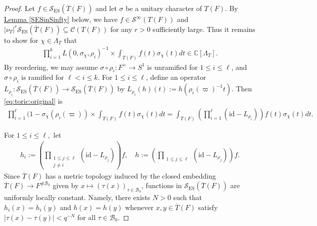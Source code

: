 \documentclass[10pt]{amsart}
\theoremstyle{definition}
\numberwithin{equation}{section}
\numberwithin{equation}{subsection}
\newcommand{\CC}{\mathbb{C}}
\begin{document}
\begin{proof} Let $f\in \mathcal{S}_{\mathrm{ES}}(\overline{T}(F))$ and let $\sigma$ be a unitary character of $T(F)$. By \hyperref[SESinSinfty]{Lemma \ref{SESinSinfty}} below, we have $f\in \mathcal{S}^\infty(T(F))$ and $|\nu_T|^r\mathcal{S}_{\mathrm{ES}}(\overline{T}(F))\subseteq \mathcal{C}(T(F))$ for any $r>0$ sufficiently large. Thus it remains to show for $\chi\in \Lambda_T$ that
\begin{align}\label{eq:toric:original}
     \prod_{i=1}^k L(0,\sigma_\chi,\rho_i)^{-1} \times \int_{T(F)} f(t)\sigma_\chi(t)dt\in \CC[\Lambda_T].
\end{align}
By reordering, we may assume $\sigma\circ \rho_i:F^\times\to S^1$ is unramified for $1\le i\le \ell$, and $\sigma\circ\rho_i$ is ramified for $\ell<i\le k$. For $1\le i\le\ell$, define an operator $L_{\rho_i}:\mathcal{S}_{\mathrm{ES}}(\overline{T}(F))\to \mathcal{S}_{\mathrm{ES}}(\overline{T}(F))$ by $L_{\rho_i}(h)(t) := h(\rho_i(\varpi)^{-1}t).$
Then \eqref{eq:toric:original} is
\begin{align*}
    \prod_{i=1}^\ell (1-\sigma_\chi(\rho_i(\varpi))\times \int_{T(F)} f(t)\sigma_\chi(t)dt = \int_{T(F)} \left(\prod_{i=1}^\ell(\mathrm{id}-L_{\rho_i})\right)f(t) \sigma_\chi(t) dt.
\end{align*}

For $1\le i\le \ell,$ let 
\begin{align*}
h_i := \left(\prod_{\substack{1\leq j\leq \ell\\j\neq i}}(\mathrm{id}-L_{\rho_j})\right)f, \quad  h:=\left(\prod_{\substack{1\leq j\leq \ell}}(\mathrm{id}-L_{\rho_j})\right)f.
\end{align*}
Since $\overline{T}(F)$ has a metric topology induced by the closed embedding $\overline{T}(F)\to F^{\#\mathcal{B}_0}$ given by $x\mapsto (\tau(x))_{\tau\in\mathcal{B}_0}$, functions in $\mathcal{S}_{\mathrm{ES}}(\overline{T}(F))$ are uniformly locally constant. Namely, there exists $N>0$ such that  $h_i(x) = h_i(y)$ and $h(x) = h(y)$ whenever $x,y\in \overline{T}(F)$ satisfy $|\tau(x) - \tau(y)|< q^{-N}$ for all $\tau\in \mathcal{B}_0$.


\end{proof}
\end{document}
